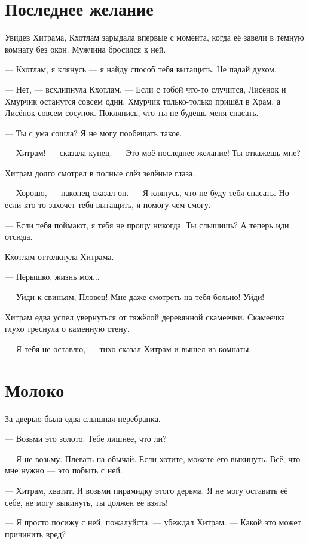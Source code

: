 \section{Последнее желание}

Увидев Хитрама, Кхотлам зарыдала впервые с момента, когда её завели в тёмную комнату без окон.
Мужчина бросился к ней.

--- Кхотлам, я клянусь --- я найду способ тебя вытащить.
Не падай духом.

--- Нет, --- всхлипнула Кхотлам.
--- Если с тобой что-то случится, Лисёнок и Хмурчик останутся совсем одни.
Хмурчик только-только пришёл в Храм, а Лисёнок совсем сосунок.
Поклянись, что ты не будешь меня спасать.

--- Ты с ума сошла?
Я не могу пообещать такое.

--- Хитрам! --- сказала купец.
--- Это моё последнее желание!
Ты откажешь мне?

Хитрам долго смотрел в полные слёз зелёные глаза.

--- Хорошо, --- наконец сказал он.
--- Я клянусь, что не буду тебя спасать.
Но если кто-то захочет тебя вытащить, я помогу чем смогу.

--- Если тебя поймают, я тебя не прощу никогда.
Ты слышишь?
А теперь иди отсюда.

Кхотлам оттолкнула Хитрама.

--- Пёрышко, жизнь моя...

--- Уйди к свиньям, Пловец!
Мне даже смотреть на тебя больно!
Уйди!

Хитрам едва успел увернуться от тяжёлой деревянной скамеечки.
Скамеечка глухо треснула о каменную стену.

--- Я тебя не оставлю, --- тихо сказал Хитрам и вышел из комнаты.

\section{Молоко}

За дверью была едва слышная перебранка.

--- Возьми это золото.
Тебе лишнее, что ли?

--- Я не возьму.
Плевать на обычай.
Если хотите, можете его выкинуть.
Всё, что мне нужно --- это побыть с ней.

--- Хитрам, хватит.
И возьми пирамидку этого дерьма.
Я не могу оставить её себе, не могу выкинуть, ты должен её взять!

--- Я просто посижу с ней, пожалуйста, --- убеждал Хитрам.
--- Какой это может причинить вред?

